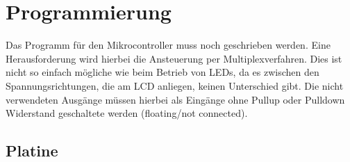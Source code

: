 \section{Programmierung}

Das Programm für den Mikrocontroller muss noch geschrieben werden. Eine Herausforderung wird hierbei die Ansteuerung per Multiplexverfahren. Dies ist nicht so einfach mögliche wie beim Betrieb von LEDs, da es zwischen den Spannungsrichtungen, die am LCD anliegen, keinen Unterschied gibt. Die nicht verwendeten Ausgänge müssen hierbei als Eingänge ohne Pullup oder Pulldown Widerstand geschaltete werden (floating/not connected).

\subsection{Platine}\label{subsec:platine}